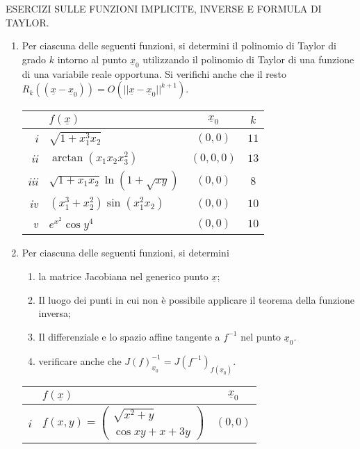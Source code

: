 
\centerline{\Large ESERCIZI SULLE FUNZIONI IMPLICITE, INVERSE E FORMULA DI TAYLOR.}
\bigskip\bigskip

\begin{enumerate}
\item Per ciascuna delle seguenti funzioni, si determini il polinomio di Taylor
 di grado $k$ intorno al punto $\underline{x}_0$ utilizzando il polinomio
di Taylor di una funzione di una variabile reale opportuna. Si verifichi
anche che il resto $R_k((\underline{x}-\underline{x}_0))=
O(||\underline{x}-\underline{x}_0||^{k+1})$.
\begin{center}
\begin{tabular}{|r||l|c|c|}
\hline
 & $f(\underline{x})$ & $\underline{x}_0$ & $k$\\
\hline
\hline
{\it i} &$\sqrt{1+x_1^3x_2} $ & $(0,0)$ & $11$\\
\hline
{\it ii} &$\arctan(x_1x_2x_3^2)$ & $(0,0,0)$ & $13$\\
\hline
{\it iii} &$\sqrt{1+x_1x_2}\ln{(1+\sqrt{xy})}$ & $(0,0)$ & $8$\\
\hline
{\it iv} &$(x_1^3+x_2^2)\sin{(x_1^2x_2)}$ & $(0,0)$ & $10$ \\
\hline
{\it v} & $e^{x^2}\cos{y^4}$ & $(0,0)$ & $10$\\
\hline
\end{tabular}
\end{center}
\item Per ciascuna delle seguenti funzioni, si determini
\begin{enumerate}
\item la matrice Jacobiana nel generico punto $\underline{x}$;
\item Il luogo dei punti in cui non \`e possibile applicare
il teorema della funzione inversa;
\item Il differenziale e lo spazio affine tangente a $f^{-1}$ 
nel punto $\underline{x}_0$.
\item verificare anche che $J(f)_{\underline{x}_0}^{-1}=
J(f^{-1})_{f(\underline{x}_0)}$.
\end{enumerate}
\begin{center}
\begin{tabular}{|r||l|c|}
\hline
 & $f(\underline{x})$ & $\underline{x}_0$ \\
\hline
\hline
{\it i} &$\underline{f}(x,y)=\left(\begin{array}{l}\sqrt{x^2+y} \\
\cos xy +x +3y \end{array}\right)$ & $(0,0)$ \\

\end{tabular}
\end{center}
\end{enumerate}
